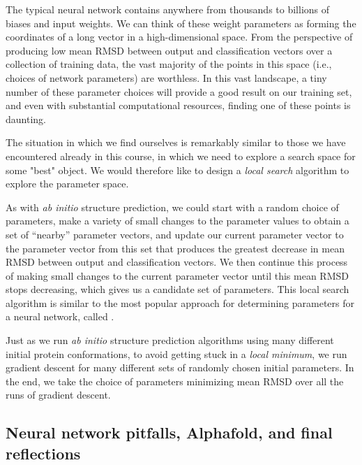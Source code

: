 The typical neural network contains anywhere from thousands to billions of biases and input weights. We can think of these weight parameters as forming the coordinates of a long vector in a high-dimensional space. From the perspective of producing low mean RMSD between output and classification vectors over a collection of training data, the vast majority of the points in this space (i.e., choices of network parameters) are worthless. In this vast landscape, a tiny number of these parameter choices will provide a good result on our training set, and even with substantial computational resources, finding one of these points is daunting.

The situation in which we find ourselves is remarkably similar to those we have encountered already in this course, in which we need to explore a search space for some "best" object. We would therefore like to design a \textit{local search} algorithm to explore the parameter space.

As with \textit{ab initio} structure prediction, we could start with a random choice of parameters, make a variety of small changes to the parameter values to obtain a set of ``nearby'' parameter vectors, and update our current parameter vector to the parameter vector from this set that produces the greatest decrease in mean RMSD between output and classification vectors. We then continue this process of making small changes to the current parameter vector until this mean RMSD stops decreasing, which gives us a candidate set of parameters. This local search algorithm is similar to the most popular approach for determining parameters for a neural network, called .\\

\begin{qbox}\end{qbox}

Just as we run \textit{ab initio} structure prediction algorithms using many different initial protein conformations, to avoid getting stuck in a \textit{local minimum}, we run gradient descent for many different sets of randomly chosen initial parameters. In the end, we take the choice of parameters minimizing mean RMSD over all the runs of gradient descent.

\subsection{Neural network pitfalls, Alphafold, and final reflections}

